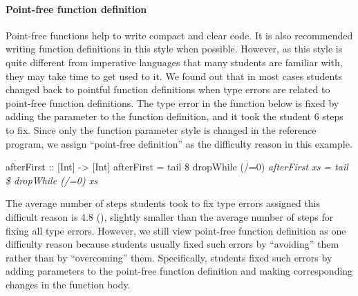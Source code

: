 \documentclass[12pt]{report}	%
\begin{document}
\paragraph{Point-free function definition}
%
Point-free functions
help to write compact and clear code. It is
also recommended writing function definitions in
this style when possible.
However, as this style is quite different
from imperative languages that many students are familiar
with, they may take time to get used to it.
We found out that in most cases students changed back
to pointful function definitions
when type errors are related to point-free function definitions.
The type error in the function  below
is fixed by adding the parameter to the function definition,
and it took the student 6 steps to fix. Since only the 
function parameter style is changed in the reference program,
we assign ``point-free definition'' as the difficulty reason in this example.
%
\begin{program}
afterFirst :: [Int] -> [Int]
afterFirst = tail \$ dropWhile (/=0)
\it{afterFirst xs = tail \$ dropWhile (/=0) xs}
\end{program}
%
The average number of 
steps students took to fix type errors assigned this difficult
reason is 4.8 (), slightly smaller than
the average number of steps for fixing all type errors. 
However, we still view point-free function definition as one 
difficulty reason because students usually fixed such errors
by ``avoiding'' them rather than by ``overcoming'' them. Specifically,
students fixed such errors by adding parameters to the point-free function definition 
and making corresponding changes in the function body.
\end{document}
